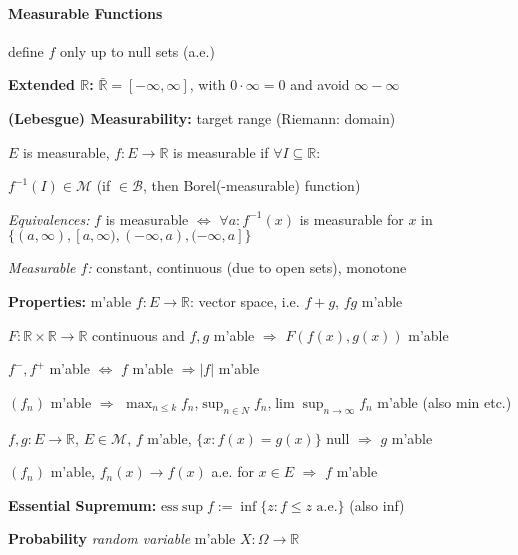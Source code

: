 \documentclass[8pt,twoside]{extarticle}
\begin{document}
\begin{multicols}{2}
\paragraph{Measurable Functions} define $f$ only up to null sets (a.e.)

\textbf{Extended $\mathbb{R}$:} $\bar{\mathbb{R}} = [-\infty, \infty]$, with $0\cdot\infty=0$ and avoid $\infty{-}\infty$

\textbf{(Lebesgue) Measurability:} target range (Riemann: domain)

$E$ is measurable, $f:E\to\mathbb{R}$ is measurable if $\forall I \subseteq \mathbb{R}:$

$f^{-1}(I)\in \mathcal{M}$ (if $\in \mathcal{B}$, then Borel(-measurable) function)

\textit{Equivalences:} $f$ is measurable $\Leftrightarrow$ $\forall a: f^{-1}(x)$ is measurable \newline for $x$ in $\{(a,\infty),[a,\infty), (-\infty,a), (-\infty,a]\}$

\textit{Measurable $f$:} constant, continuous (due to open sets), monotone

\textbf{Properties:}
m'able $f:E{\to}\mathbb{R}$: vector space, i.e. $f{+}g$, $fg$ m'able

$F:\mathbb{R}\times\mathbb{R}\to \mathbb{R}$ continuous and $f,g$ m'able $\Rightarrow$ $F(f(x),g(x))$ m'able

$f^-,f^+$ m'able $\Leftrightarrow$ $f$ m'able $\Rightarrow |f|$ m'able


$(f_n)$ m'able $\Rightarrow$ $\displaystyle\max_{n\leq k} f_n$,$\displaystyle\sup_{n\in N} f_n$,$\displaystyle\lim\sup_{n{\to} \infty} f_n$ m'able (also min etc.)

$f,g: E{\to} \mathbb{R}$, $E\in \mathcal{M}$, $f$ m'able, $\{x: f(x)=g(x)\}$ null $\Rightarrow$ $g$ m'able

$(f_n)$ m'able, $f_n(x)\to f(x)$ a.e. for $x\in E$ $\Rightarrow$ $f$ m'able

\textbf{Essential Supremum:} $\mathrm{ess}\sup f:=\inf\{z:f\leq z \text{ a.e.}\}$ (also inf)


\textbf{Probability} \textit{random variable} m'able $X:\Omega \to \mathbb{R}$


\end{multicols}
\end{document}
